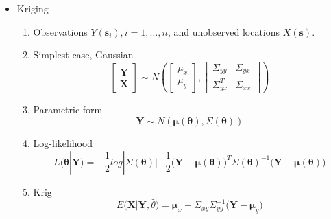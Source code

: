 \documentclass{article}
\begin{document}
\begin{itemize}
\item Kriging
  \begin{enumerate}
  \item Observations $Y(\pmb{s}_{i}), i = 1, \hdots, n$, and unobserved locations $X(\pmb{s})$. 
  \item Simplest case, Gaussian
  $$\begin{bmatrix}
        \pmb{Y}   \\
        \pmb{X}
        \end{bmatrix}
      \sim
     N \left(
        \begin{bmatrix}
        \mu_{x}   \\
        \mu_{y}
        \end{bmatrix}
        ,
        \begin{bmatrix}
        \Sigma_{yy}     & \Sigma_{yx} \\
        \Sigma_{yx}^{T} & \Sigma_{xx}
        \end{bmatrix}
        \right) $$
  \item Parametric form
  $$ \pmb{Y} \sim N(\pmb{\mu(\theta)}, \Sigma(\pmb{\theta})) $$
  \item Log-likelihood
  $$ L(\pmb{\theta}|\pmb{Y}) = -\frac{1}{2}log|\Sigma(\pmb{\theta})| - \frac{1}{2}\Big( \pmb{Y} - \pmb{\mu}(\pmb{\theta})\Big)^{T} \Sigma(\pmb{\theta})^{-1} \Big( \pmb{Y} - \pmb{\mu}(\pmb{\theta})\Big) $$
  \item Krig
  $$ E \Big(\pmb{X}|\pmb{Y}, \hat{\theta} \Big) = \pmb{\mu}_{x} + \Sigma_{xy} \Sigma_{yy}^{-1} (\pmb{Y} - \pmb{\mu}_{y} \Big)$$
  \end{enumerate}
  

\end{itemize}
\end{document}
